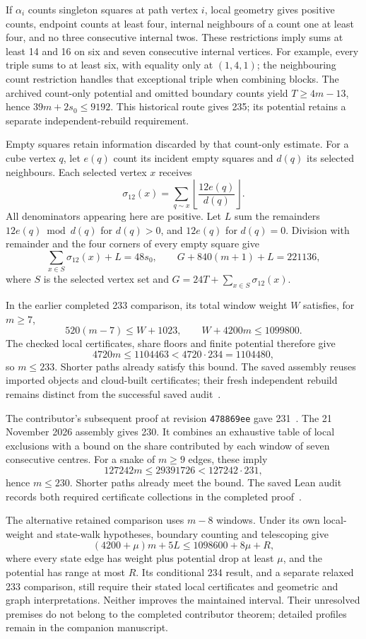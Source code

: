 \documentclass[11pt,a4paper]{article}
\begin{document}
If $\alpha_i$ counts singleton squares at path vertex $i$, local geometry
gives positive counts, endpoint counts at least four, internal neighbours
of a count one at least four, and no three consecutive internal twos.
These restrictions imply sums at least 14 and 16 on six and seven
consecutive internal vertices. For example, every triple sums to at least
six, with equality only at $(1,4,1)$; the neighbouring count restriction
handles that exceptional triple when combining blocks.
The archived count-only potential and omitted boundary counts yield
$T\ge4m-13$, hence $39m+2s_0\le9192$. This historical route gives 235;
its potential retains a separate independent-rebuild requirement.

Empty squares retain information discarded by that count-only estimate.
For a cube vertex $q$, let $e(q)$ count its incident empty squares and
$d(q)$ its selected neighbours. Each selected vertex $x$ receives
\[
\sigma_{12}(x)=\sum_{q\sim x}
 \left\lfloor\frac{12e(q)}{d(q)}\right\rfloor.
\]
All denominators appearing here are positive. Let $L$ sum the remainders
$12e(q)\bmod d(q)$ for $d(q)>0$, and $12e(q)$ for $d(q)=0$.
Division with remainder and the four corners of every empty square give
\[
\sum_{x\in S}\sigma_{12}(x)+L=48s_0,\qquad
G+840(m+1)+L=221136,
\]
where $S$ is the selected vertex set and $G=24T+\sum_{x\in S}\sigma_{12}(x)$.

In the earlier completed 233 comparison, its total window weight $W$
satisfies, for $m\ge7$,
\[
520(m-7)\le W+1023,\qquad W+4200m\le1099800.
\]
The checked local certificates, share floors and finite potential therefore give
\[
4720m\le1104463<4720\cdot234=1104480,
\]
so $m\le233$. Shorter paths already satisfy this bound. The saved assembly
reuses imported objects and cloud-built certificates; their fresh independent
rebuild remains distinct from the successful saved audit~\cite{bound233archive}.

The contributor's subsequent proof at revision \texttt{478869ee}
gave 231~\cite{bound231archive}. The 21 November 2026 assembly gives
230. It combines an exhaustive table of local exclusions with a bound
on the share contributed by each window of seven consecutive centres.
For a snake of $m\ge9$ edges, these imply
\[
127242m\le29391726<127242\cdot231,
\]
hence $m\le230$. Shorter paths already meet the bound. The saved
Lean audit records both required certificate collections in the
completed proof~\cite{bound230archive}.

The alternative retained comparison uses $m-8$ windows. Under its own
local-weight and state-walk hypotheses, boundary counting and telescoping give
\[
(4200+\mu)m+5L\le1098600+8\mu+R,
\]
where every state edge has weight plus potential drop at least $\mu$,
and the potential has range at most $R$. Its conditional 234 result,
and a separate relaxed 233 comparison, still require their stated local
certificates and geometric and graph interpretations. Neither improves the
maintained interval. Their unresolved premises do not belong to the completed
contributor theorem; detailed profiles remain in the companion manuscript.
\end{document}
